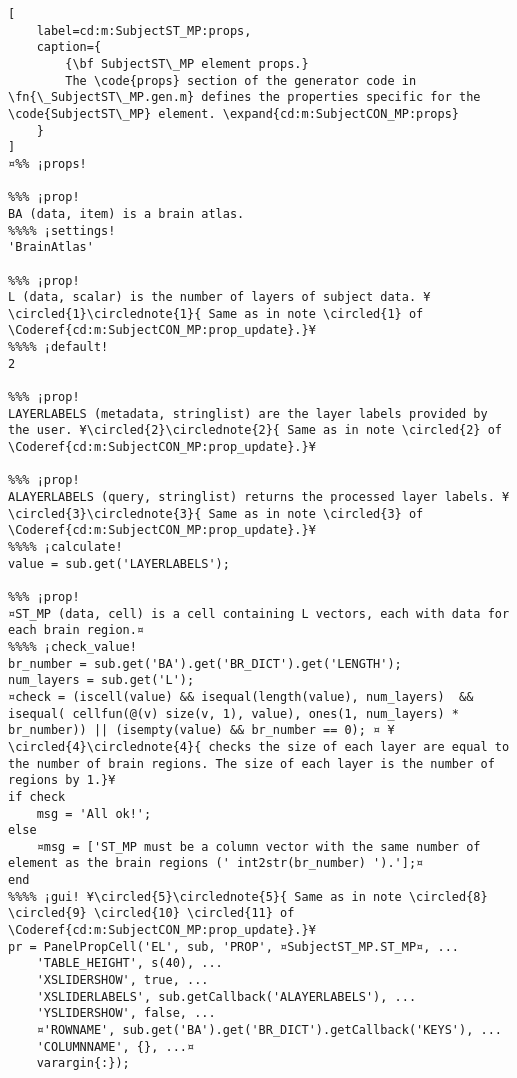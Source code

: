 \documentclass{tufte-handout}
\begin{document}
\begin{lstlisting}[
	label=cd:m:SubjectST_MP:props,
	caption={
		{\bf SubjectST\_MP element props.}
		The \code{props} section of the generator code in \fn{\_SubjectST\_MP.gen.m} defines the properties specific for the \code{SubjectST\_MP} element. \expand{cd:m:SubjectCON_MP:props}
	}
]
¤%% ¡props!

%%% ¡prop!
BA (data, item) is a brain atlas.
%%%% ¡settings!
'BrainAtlas'

%%% ¡prop!
L (data, scalar) is the number of layers of subject data. ¥\circled{1}\circlednote{1}{ Same as in note \circled{1} of \Coderef{cd:m:SubjectCON_MP:prop_update}.}¥
%%%% ¡default!
2

%%% ¡prop!
LAYERLABELS (metadata, stringlist) are the layer labels provided by the user. ¥\circled{2}\circlednote{2}{ Same as in note \circled{2} of \Coderef{cd:m:SubjectCON_MP:prop_update}.}¥

%%% ¡prop!
ALAYERLABELS (query, stringlist) returns the processed layer labels. ¥\circled{3}\circlednote{3}{ Same as in note \circled{3} of \Coderef{cd:m:SubjectCON_MP:prop_update}.}¥
%%%% ¡calculate!
value = sub.get('LAYERLABELS');

%%% ¡prop!
¤ST_MP (data, cell) is a cell containing L vectors, each with data for each brain region.¤
%%%% ¡check_value!
br_number = sub.get('BA').get('BR_DICT').get('LENGTH');
num_layers = sub.get('L');
¤check = (iscell(value) && isequal(length(value), num_layers)  && isequal( cellfun(@(v) size(v, 1), value), ones(1, num_layers) * br_number)) || (isempty(value) && br_number == 0); ¤ ¥\circled{4}\circlednote{4}{ checks the size of each layer are equal to the number of brain regions. The size of each layer is the number of regions by 1.}¥
if check
    msg = 'All ok!';
else   
    ¤msg = ['ST_MP must be a column vector with the same number of element as the brain regions (' int2str(br_number) ').'];¤
end
%%%% ¡gui! ¥\circled{5}\circlednote{5}{ Same as in note \circled{8} \circled{9} \circled{10} \circled{11} of \Coderef{cd:m:SubjectCON_MP:prop_update}.}¥
pr = PanelPropCell('EL', sub, 'PROP', ¤SubjectST_MP.ST_MP¤, ...
    'TABLE_HEIGHT', s(40), ...
    'XSLIDERSHOW', true, ...
    'XSLIDERLABELS', sub.getCallback('ALAYERLABELS'), ...
    'YSLIDERSHOW', false, ...
    ¤'ROWNAME', sub.get('BA').get('BR_DICT').getCallback('KEYS'), ...
    'COLUMNNAME', {}, ...¤
    varargin{:});
\end{lstlisting}
\end{document}

